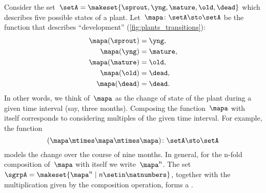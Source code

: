 \begin{example}
    \label{exa:plant-trafo-semigroup}
    Consider the set~$\setA = \makeset{ \sprout, \yng, \mature, \old, \dead }$ which describes five possible states of a plant.
    Let~$\mapa \colon \setA \sto \setA$ be the function that describes ``development'' (\cref{fig:plants_transitions}):
    \begin{align}
        \mapa(\sprout) & =  \yng, \\
        \mapa(\yng)    & =  \mature, \\
        \mapa(\mature) & =  \old, \\
        \mapa( \old)   & = \dead, \\
        \mapa (\dead)  & = \dead.
    \end{align}
    In other words, we think of~$\mapa$ as the change of state of the plant during a given time interval (say, three months).
    Composing the function~$\mapa$ with itself corresponds to considering multiples of the given time interval.
    For example, the function
    \begin{equation}
        (\mapa \mtimes \mapa \mtimes \mapa)
        \colon \setA \sto \setA
    \end{equation}
    models the change over the course of nine months.
    In general, for the n-fold composition of~$\mapa$ with itself we write~$\mapa^n$.
    The set~$\sgrpA = \makeset{ \mapa^n \mid n \setin \natnumbers }$, together with the multiplication given by the composition operation, forms a .
\end{example}
%
